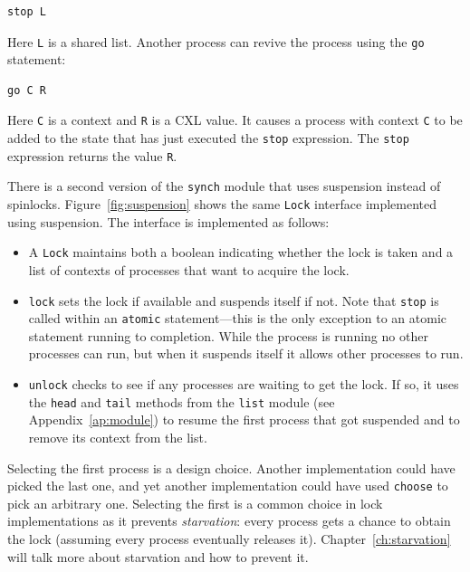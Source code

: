 \documentclass{report}
\newenvironment{code}{
\tcolorbox
}{
\endtcolorbox
}
\begin{document}
\begin{code}
\begin{verbatim}
stop L
\end{verbatim}
\end{code}

Here \texttt{L} is a shared list.
Another process can revive the process using the \texttt{go}
statement:

\begin{code}
\begin{verbatim}
go C R
\end{verbatim}
\end{code}

Here \texttt{C} is a context and \texttt{R} is a CXL value.
It causes a process with context \texttt{C} to be added to the state that has
just executed the \texttt{stop}
expression.  The \texttt{stop} expression returns the value \texttt{R}.

There is a second version of the \texttt{synch} module that uses suspension
instead of spinlocks.
Figure~\ref{fig:suspension} shows the same \texttt{Lock} interface implemented
using suspension.
The interface is implemented as follows:
\begin{itemize}
\item A \texttt{Lock} maintains both a boolean indicating whether the
lock is taken and a list of contexts of processes that want to acquire the lock.
\item
\texttt{lock} sets the lock if available and suspends itself if not.
Note that \texttt{stop} is called within an \texttt{atomic} statement---this is
the only exception to an atomic statement running to completion.  While the
process is running no other processes can run, but when it suspends itself
it allows other processes to run.
\item
\texttt{unlock} checks to see if any processes are waiting to get the lock.
If so, it uses the \texttt{head} and \texttt{tail}
methods from the \texttt{list} module (see Appendix~\ref{ap:module})
to resume the first process that got
suspended and to remove its context from the list.
\end{itemize}
Selecting the first process is a design choice.  Another implementation could
have picked the last one, and yet another implementation could have used
\texttt{choose} to pick an arbitrary one.  Selecting the first is a common
choice in lock implementations as it prevents \emph{starvation}:
every process
gets a chance to obtain the lock (assuming every process eventually releases
it).  Chapter~\ref{ch:starvation} will talk more about starvation and how
to prevent it.
\end{document}
